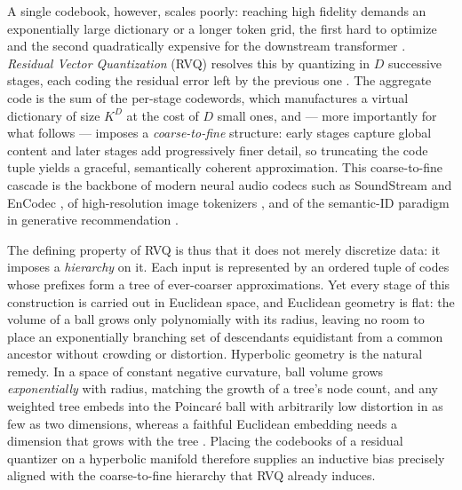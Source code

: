 \documentclass[12pt]{report}
\begin{document}
A single codebook, however, scales poorly: reaching high fidelity demands an exponentially large dictionary or a longer token grid, the first hard to optimize and the second quadratically expensive for the downstream transformer \cite{soundstream}. \emph{Residual Vector Quantization} (RVQ) resolves this by quantizing in $D$ successive stages, each coding the residual error left by the previous one \cite{soundstream, lee2022rqvae}. The aggregate code is the sum of the per-stage codewords, which manufactures a virtual dictionary of size $K^D$ at the cost of $D$ small ones, and --- more importantly for what follows --- imposes a \emph{coarse-to-fine} structure: early stages capture global content and later stages add progressively finer detail, so truncating the code tuple yields a graceful, semantically coherent approximation. This coarse-to-fine cascade is the backbone of modern neural audio codecs such as SoundStream \cite{soundstream} and EnCodec \cite{encodec}, of high-resolution image tokenizers \cite{lee2022rqvae}, and of the semantic-ID paradigm in generative recommendation \cite{tiger}.

The defining property of RVQ is thus that it does not merely discretize data: it imposes a \emph{hierarchy} on it. Each input is represented by an ordered tuple of codes whose prefixes form a tree of ever-coarser approximations. Yet every stage of this construction is carried out in Euclidean space, and Euclidean geometry is flat: the volume of a ball grows only polynomially with its radius, leaving no room to place an exponentially branching set of descendants equidistant from a common ancestor without crowding or distortion. Hyperbolic geometry is the natural remedy. In a space of constant negative curvature, ball volume grows \emph{exponentially} with radius, matching the growth of a tree's node count, and any weighted tree embeds into the Poincar\'e ball with arbitrarily low distortion in as few as two dimensions, whereas a faithful Euclidean embedding needs a dimension that grows with the tree \cite{cannon1997hyperbolic, sala2018representation, nickel2017poincare}. Placing the codebooks of a residual quantizer on a hyperbolic manifold therefore supplies an inductive bias precisely aligned with the coarse-to-fine hierarchy that RVQ already induces.
\end{document}
